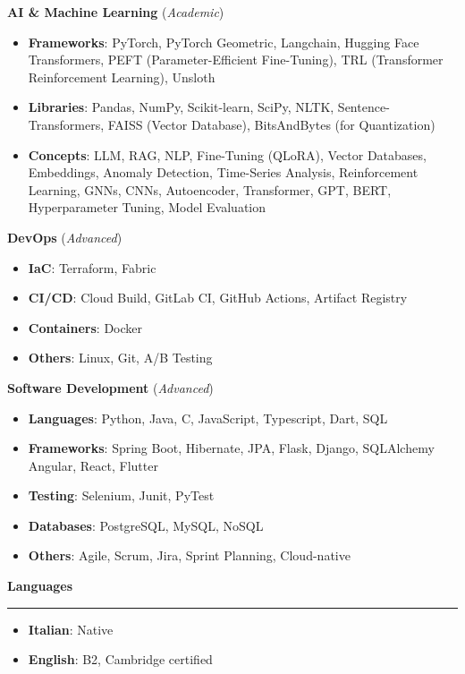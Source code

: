 \documentclass[9pt, a4paper]{article}
\newcommand{\cvsection}[1]{%
	\vspace{2pt}\par
	{\Large\bfseries\color{sectionblue}#1}\par
	\vspace{2pt}\hrule\vspace{6pt}
}
\begin{document}
\begin{minipage}[t]{0.32\linewidth}
		{\bfseries AI \& Machine Learning} (\textit{Academic})
		\begin{itemize}[leftmargin=*, nosep, itemsep=2pt]
			\footnotesize
			\item \textbf{Frameworks}: PyTorch, PyTorch Geometric, Langchain, Hugging Face Transformers, PEFT (Parameter-Efficient Fine-Tuning), TRL (Transformer Reinforcement Learning), Unsloth
			
			\item \textbf{Libraries}: Pandas, NumPy, Scikit-learn, SciPy, NLTK, Sentence-Transformers, FAISS (Vector Database), BitsAndBytes (for Quantization) 
			
			\item \textbf{Concepts}: LLM, RAG, NLP, Fine-Tuning (QLoRA), Vector Databases, Embeddings, Anomaly Detection, Time-Series Analysis, Reinforcement Learning, GNNs, CNNs, Autoencoder, Transformer, GPT, BERT, Hyperparameter Tuning, Model Evaluation
		\end{itemize}
		\vspace{4pt}
		
		{\bfseries DevOps} (\textit{Advanced})
		\begin{itemize}[leftmargin=*, nosep, itemsep=2pt]
			\footnotesize
			\item \textbf{IaC}: Terraform, Fabric
			\item \textbf{CI/CD}: Cloud Build, GitLab CI, GitHub Actions, Artifact Registry
			\item \textbf{Containers}: Docker
			\item \textbf{Others}: Linux, Git, A/B Testing
		\end{itemize}
		\vspace{4pt}
		
		{\bfseries Software Development} (\textit{Advanced})
		\begin{itemize}[leftmargin=*, nosep, itemsep=2pt]
			\footnotesize
			\item \textbf{Languages}: Python, Java, C, JavaScript, Typescript, Dart, SQL
			\item \textbf{Frameworks}: Spring Boot, Hibernate, JPA, Flask, Django, SQLAlchemy Angular, React, Flutter
			\item \textbf{Testing}: Selenium, Junit, PyTest
			\item \textbf{Databases}: PostgreSQL, MySQL, NoSQL
			\item \textbf{Others}: Agile, Scrum, Jira, Sprint Planning, Cloud-native
		\end{itemize}
		\vspace{7pt}
		
		\cvsection{Languages}
		\begin{itemize}[leftmargin=*, nosep, itemsep=2pt]
			\item \textbf{Italian}: Native
			\item \textbf{English}: B2, Cambridge certified
		\end{itemize}
		
	\end{minipage}
	
\end{document}
